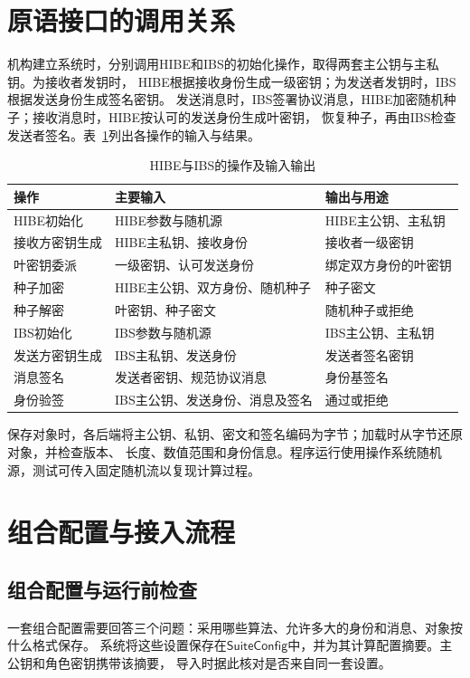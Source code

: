 \section{原语接口的调用关系}
机构建立系统时，分别调用HIBE和IBS的初始化操作，取得两套主公钥与主私钥。为接收者发钥时，
HIBE根据接收身份生成一级密钥；为发送者发钥时，IBS根据发送身份生成签名密钥。
发送消息时，IBS签署协议消息，HIBE加密随机种子；接收消息时，HIBE按认可的发送身份生成叶密钥，
恢复种子，再由IBS检查发送者签名。表~\ref{tab:backend-interfaces}列出各操作的输入与结果。

\begin{table}[H]
\centering\small
\caption{HIBE与IBS的操作及输入输出}
\label{tab:backend-interfaces}
\begin{tabularx}{\textwidth}{@{}p{}p{}X@{}}
\toprule
\rowcolor{black!8} 操作 & 主要输入 & 输出与用途 \\
\midrule
HIBE初始化 & HIBE参数与随机源 & HIBE主公钥、主私钥 \\
接收方密钥生成 & HIBE主私钥、接收身份 & 接收者一级密钥 \\
叶密钥委派 & 一级密钥、认可发送身份 & 绑定双方身份的叶密钥 \\
种子加密 & HIBE主公钥、双方身份、随机种子 & 种子密文 \\
种子解密 & 叶密钥、种子密文 & 随机种子或拒绝 \\
\midrule
IBS初始化 & IBS参数与随机源 & IBS主公钥、主私钥 \\
发送方密钥生成 & IBS主私钥、发送身份 & 发送者签名密钥 \\
消息签名 & 发送者密钥、规范协议消息 & 身份基签名 \\
身份验签 & IBS主公钥、发送身份、消息及签名 & 通过或拒绝 \\
\bottomrule
\end{tabularx}
\end{table}

保存对象时，各后端将主公钥、私钥、密文和签名编码为字节；加载时从字节还原对象，并检查版本、
长度、数值范围和身份信息。程序运行使用操作系统随机源，测试可传入固定随机流以复现计算过程。

\section{组合配置与接入流程}

\subsection{组合配置与运行前检查}
一套组合配置需要回答三个问题：采用哪些算法、允许多大的身份和消息、对象按什么格式保存。
系统将这些设置保存在$\mathsf{SuiteConfig}$中，并为其计算配置摘要。主公钥和角色密钥携带该摘要，
导入时据此核对是否来自同一套设置。

